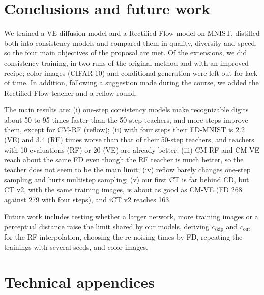 \documentclass{article}
\begin{document}
\section{Conclusions and future work}
\label{sec:conclusions}

We trained a VE diffusion model and a Rectified Flow model on MNIST, distilled
both into consistency models and compared them in quality, diversity and speed,
so the four main objectives of the proposal are met. Of the extensions, we did
consistency training, in two runs of the original method and with an improved recipe; color
images (CIFAR-10) and conditional generation were left out for lack of time. In
addition, following a suggestion made during the course, we added the Rectified
Flow teacher and a reflow round.

The main results are: (i) one-step consistency models make recognizable digits
about 50 to 95 times faster than the 50-step teachers, and more steps improve
them, except for CM-RF (reflow); (ii) with four steps their FD-MNIST is 2.2 (VE)
and 3.4 (RF) times worse than that of their 50-step teachers, and teachers with
10 evaluations (RF) or 20 (VE) are already better; (iii) CM-RF and CM-VE reach
about the same FD even though the RF teacher is much better, so the teacher does
not seem to be the main limit; (iv) reflow barely changes one-step sampling and
hurts multistep sampling; (v) our first
CT is far behind CD, but CT v2, with the same training images, is about as good as
CM-VE (FD 268 against 279 with four steps), and iCT v2 reaches 163.

Future work includes testing whether a larger network, more training images or a
perceptual distance raise the limit shared by our models, deriving $c_\text{skip}$
and $c_\text{out}$ for the RF interpolation, choosing the re-noising times by FD,
repeating the trainings with several seeds, and color images.

\clearpage
{\small


}

\clearpage
\appendix
\raggedbottom
\section{Technical appendices}
\label{sec:appendix}
\end{document}
